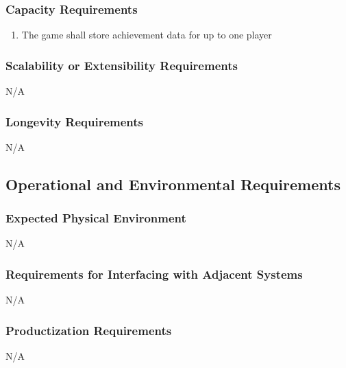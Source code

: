 \documentclass[12pt, titlepage]{article}
\begin{document}
\subsubsection{Capacity Requirements}
\label{ssub:capacity_requirements}
\begin{enumerate}[start=5,label={ PR\arabic*.}]
        \item The game shall store achievement data for up to one player

\end{enumerate}

\subsubsection{Scalability or Extensibility Requirements}
\label{ssub:scalability_or_extensibility_requirements}
N/A

\subsubsection{Longevity Requirements}
\label{ssub:longevity_requirements}
N/A


\subsection{Operational and Environmental Requirements}
\label{sub:operational_and_environmental_requirements}

\subsubsection{Expected Physical Environment}
\label{ssub:expected_physical_environment}
N/A

\subsubsection{Requirements for Interfacing with Adjacent Systems}
\label{ssub:requirements_for_interfacing_with_adjacent_systems}
N/A

\subsubsection{Productization Requirements}
\label{ssub:productization_requirements}
N/A
\end{document}
